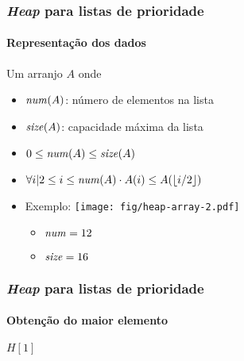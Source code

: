 \documentclass{beamer}
\begin{document}
\begin{frame}

  \frametitle{\textit{Heap} para listas de prioridade}
  \framesubtitle{Representação dos dados}

Um arranjo $A$ onde
\begin{itemize}
\item $\id{num}(A)$: número de elementos na lista
\item $\id{size}(A)$: capacidade máxima da lista
\item $0 \le \id{num}(A) \le \id{size}(A)$
\item $\forall i | 2 \le i \le \id{num}(A) \cdot A(i) \le A(\lfloor i/2 \rfloor)$
\item Exemplo:
{\center \texttt{[image: fig/heap-array-2.pdf]}}
\begin{itemize}
\item $\id{num} = 12$
\item $\id{size} = 16$
\end{itemize}
\end{itemize}

\end{frame}

\begin{frame}

  \frametitle{\textit{Heap} para listas de prioridade}
  \framesubtitle{Obtenção do maior elemento}

\begin{codebox}
\zi \Comment {}
\li \Return $H[1]$
\zi \Comment {}
    \End
\end{codebox}  

\end{frame}
\end{document}
